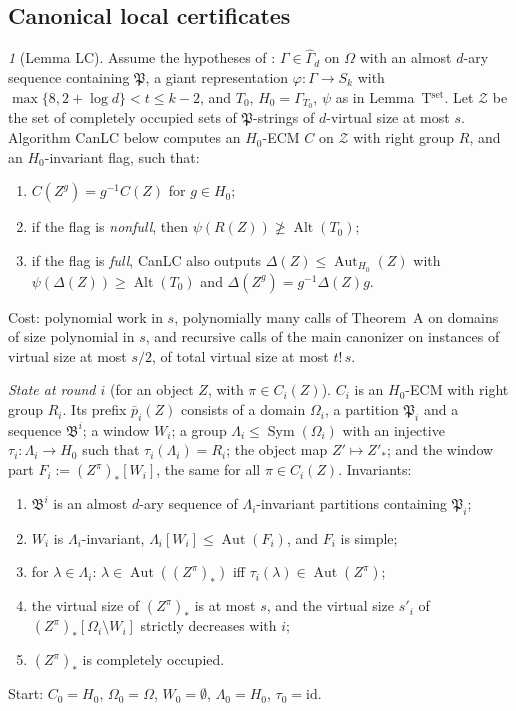 \documentclass[11pt]{article}
\newenvironment{enumlab}[2][]{\begin{enumerate}\renewcommand{\theenumi}{#1#2{enumi}}%
  \renewcommand{\labelenumi}{(\theenumi)}}{\end{enumerate}}
\theoremstyle{plain}
\theoremstyle{definition}
\theoremstyle{remark}
\theoremstyle{named}
\newtheorem*{named}{}
\theoremstyle{namedrm}
\newcommand{\Sym}{\operatorname{Sym}}
\newcommand{\Alt}{\operatorname{Alt}}
\newcommand{\Aut}{\operatorname{Aut}}
\newcommand{\Gd}{\widehat{\Gamma}_d}
\newcommand{\fB}{\mathfrak{B}}
\newcommand{\fP}{\mathfrak{P}}
\newcommand{\cZ}{\mathcal{Z}}
\begin{document}
\subsection{Canonical local certificates}

\begin{named}[Lemma LC]
Assume the hypotheses of \cite[Thm.~4.24]{Neu20}: $\Gamma\in\Gd$ on $\Omega$ with an almost $d$-ary sequence
containing $\fP$, a giant representation $\varphi\colon\Gamma\to S_k$ with $\max\{8,2+\log d\}<t\le k-2$, and
$T_0$, $H_0=\Gamma_{T_0}$, $\psi$ as in Lemma~T$^{\text{set}}$. Let $\cZ$ be the set of completely occupied sets of
$\fP$-strings of $d$-virtual size at most $s$. Algorithm CanLC below computes an $H_0$-ECM $C$ on $\cZ$ with right group $R$, and
an $H_0$-invariant flag, such that:
\begin{enumlab}[LC]{\arabic}
\item $C(Z^g)=g^{-1}C(Z)$ for $g\in H_0$;
\item if the flag is \emph{nonfull}, then $\psi(R(Z))\not\ge\Alt(T_0)$;
\item if the flag is \emph{full}, CanLC also outputs $\Delta(Z)\le\Aut_{H_0}(Z)$ with $\psi(\Delta(Z))\ge\Alt(T_0)$ and
  $\Delta(Z^g)=g^{-1}\Delta(Z)g$.
\end{enumlab}
Cost: polynomial work in $s$, polynomially many calls of Theorem~A on domains of size polynomial in $s$,
and recursive calls of the main canonizer on instances of virtual size at most $s/2$, of total virtual size
at most $t!\,s$.
\end{named}

\emph{State at round $i$} (for an object $Z$, with $\pi\in C_i(Z)$). $C_i$ is an $H_0$-ECM with right group $R_i$.
Its prefix $\bar p_i(Z)$ consists of a domain $\Omega_i$, a partition $\fP_i$ and a sequence $\fB^i$; a window
$W_i$; a group $\Lambda_i\le\Sym(\Omega_i)$ with an injective $\tau_i\colon\Lambda_i\to H_0$ such that $\tau_i(\Lambda_i)=R_i$;
the object map $Z'\mapsto Z'_*$; and the window part $F_i:=(Z^\pi)_*[W_i]$, the same for all $\pi\in C_i(Z)$.
Invariants:
\begin{enumlab}[I]{\arabic}
\item $\fB^i$ is an almost $d$-ary sequence of $\Lambda_i$-invariant partitions containing $\fP_i$;
\item $W_i$ is $\Lambda_i$-invariant, $\Lambda_i[W_i]\le\Aut(F_i)$, and $F_i$ is simple;
\item for $\lambda\in\Lambda_i$: $\lambda\in\Aut((Z^\pi)_*)$ iff $\tau_i(\lambda)\in\Aut(Z^\pi)$;
\item the virtual size of $(Z^\pi)_*$ is at most $s$, and the virtual size $s'_i$ of $(Z^\pi)_*[\Omega_i\setminus W_i]$
  strictly decreases with $i$;
\item $(Z^\pi)_*$ is completely occupied.
\end{enumlab}
Start: $C_0=H_0$, $\Omega_0=\Omega$, $W_0=\emptyset$, $\Lambda_0=H_0$, $\tau_0=\mathrm{id}$.
\end{document}
